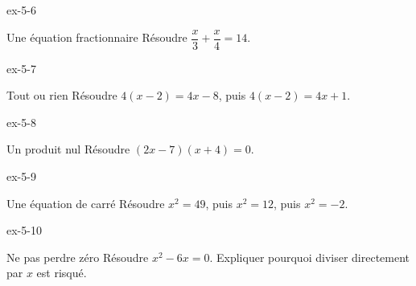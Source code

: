 \clearpage{}
\begin{blocLivre}{ex-5-6}\begin{exercice}[2]{Une équation fractionnaire}
Résoudre $\dfrac{x}{3}+\dfrac{x}{4}=14$.
\end{exercice}\end{blocLivre}
\begin{blocLivre}{ex-5-7}\begin{exercice}[2]{Tout ou rien}
Résoudre $4(x-2)=4x-8$, puis $4(x-2)=4x+1$.
\end{exercice}\end{blocLivre}
\begin{blocLivre}{ex-5-8}\begin{exercice}[2]{Un produit nul}
Résoudre $(2x-7)(x+4)=0$.
\end{exercice}\end{blocLivre}
\begin{blocLivre}{ex-5-9}\begin{exercice}[2]{Une équation de carré}
Résoudre $x^2=49$, puis $x^2=12$, puis $x^2=-2$.
\end{exercice}\end{blocLivre}
\begin{blocLivre}{ex-5-10}\begin{exercice}[2]{Ne pas perdre zéro}
Résoudre $x^2-6x=0$. Expliquer pourquoi diviser directement par $x$ est risqué.
\end{exercice}\end{blocLivre}

